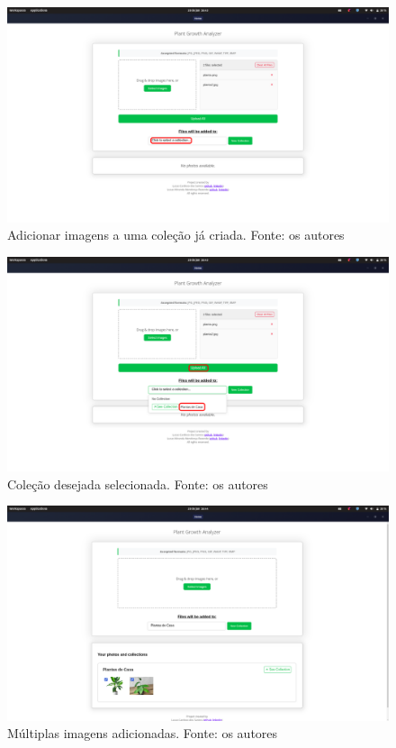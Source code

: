 \begin{figure}[H]
    \centering
    \includegraphics[width=1\textwidth]{../figures/screens/uc002/Screenshot from 2025-06-28 16-43-50.png}
    \caption{Adicionar imagens a uma coleção já criada. Fonte: os autores}
    \label{fig:uc002-screen5}
\end{figure}

\begin{figure}[H]
    \centering
    \includegraphics[width=1\textwidth]{../figures/screens/uc002/Screenshot from 2025-06-28 16-43-54.png}
    \caption{Coleção desejada selecionada. Fonte: os autores}
    \label{fig:uc002-screen6}
\end{figure}

\begin{figure}[H]
    \centering
    \includegraphics[width=1\textwidth]{../figures/screens/uc002/Screenshot from 2025-06-28 16-44-12.png}
    \caption{Múltiplas imagens adicionadas. Fonte: os autores}
    \label{fig:uc002-screen8}
\end{figure}


